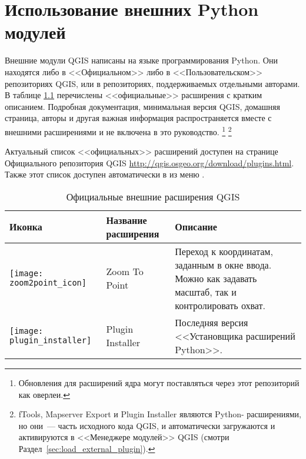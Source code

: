 
\chapter{Использование внешних Python модулей}\label{sec:external_plugins}


Внешние модули QGIS написаны на языке программирования Python. Они находятся либо в <<Официальном>>
либо в <<Пользовательском>> репозиториях QGIS, или в репозиториях, поддерживаемых
отдельными авторами.
В таблице \ref{tab:external_plugins} перечислены <<официальные>> расширения с
кратким описанием.
Подробная документация, минимальная версия QGIS, домашняя страница, авторы
и другая важная информация распространяется вместе с внешними расширениями
и не включена в это руководство.
\footnote{Обновления для расширений ядра могут поставляться через этот
репозиторий как оверлеи.}
\footnote{fTools, Mapserver Export и Plugin Installer являются Python-
расширениями, но они~--- часть исходного кода QGIS, и автоматически
загружаются и активируются в <<Менеджере модулей>> QGIS
(смотри Раздел~\ref{sec:load_external_plugin}).}

Актуальный список <<официальных>> расширений доступен на странице Официального
репозитория QGIS \url{http://qgis.osgeo.org/download/plugins.html}. Также
этот список доступен автоматически в 
из меню .

\begin{table}[H]
\centering
 \begin{tabular}{|l|l|p{8cm}|}
\hline \textbf{Иконка} & \textbf{Название расширения} & \textbf{Описание}\\
\hline
\texttt{[image: zoom2point\_icon]}
 & Zoom To Point \index{модули!Zoom To Point} & Переход к координатам,
  заданным в окне ввода. Можно как задавать масштаб, так и
  контролировать охват.\\
\hline
\texttt{[image: plugin\_installer]}
 & Plugin Installer \index{модули!Plugin Installer} & Последняя версия
 <<Установщика расширений Python>>.\\
\hline
\end{tabular}
\caption{Официальные внешние расширения QGIS}\label{tab:external_plugins}
\end{table}

